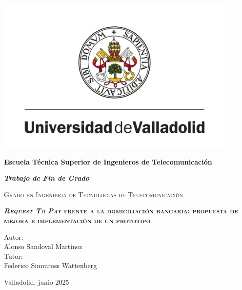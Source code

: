 \documentclass{book}
\begin{document}
\frontmatter



\begin{titlepage}
    \centering
    {\includegraphics[width=0.9\textwidth]{Imagenes/Universidad-de-Valladolid.png}}\par
    {\bfseries\Large Escuela Técnica Superior de Ingenieros de Telecomunicación\par}
    \vspace{0.5cm}
    {\bfseries\itshape\Large Trabajo de Fin de Grado \par}
    \vspace{0.5cm}
    {\scshape Grado en Ingeniería de Tecnologías de Telecomunicación \par}
    \vspace{0.5cm}
    {\bfseries\scshape\Large \textit{Request To Pay} frente a la domiciliación bancaria: propuesta de mejora e implementación de un prototipo \par}
    \vspace{1.5cm}
    { Autor: \\}
    { Alonso Sandoval Martínez }\\
    \vspace{0.5cm}
    { Tutor:\\}
    { Federico Simmross Wattenberg }\\
    \vspace{1.5cm} {Valladolid, junio 2025 \par}
\end{titlepage}


\newpage

\end{document}
